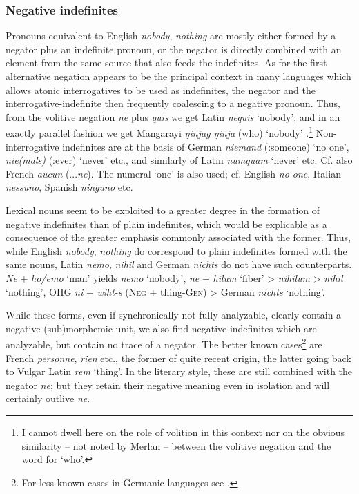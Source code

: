 \subsubsection{Negative indefinites} \label{sec:3.2.2.3}
Pronouns equivalent to English \textit{nobody}, \textit{nothing} are mostly either formed by a negator plus an indefinite pronoun, or the negator is directly combined with an element from the same source that also feeds the indefinites. As for the first alternative negation appears to be the principal context in many languages which allows atonic interrogatives to be used as indefinites, the negator and the interrogative-indefinite then frequently coalescing to a negative pronoun. Thus, from the volitive negation \textit{n\=e} plus \textit{quis} we get Latin \textit{n\=equis} ‘nobody’; and in an exactly parallel fashion we get Mangarayi \textit{ŋiñjag ŋiñja} (\volneg who) ‘nobody’ \citep[36, 119]{Merlan1982}.\footnote{I cannot dwell here on the role of volition in this context nor on the obvious similarity -- not noted by Merlan -- between the volitive negation and the word for ‘who’.} Non-interrogative indefinites are at the basis of German \textit{niemand} (\glneg:someone) ‘no one’, \textit{nie(mals)} (\glneg:ever) ‘never’ etc., and similarly of Latin \textit{numquam} ‘never’ etc. Cf. also French \textit{aucun} (...\textit{ne}). The numeral ‘one’ is also used; cf. English \textit{no one}, Italian \textit{nessuno}, Spanish \textit{ninguno} etc.

Lexical nouns seem to be exploited to a greater degree in the formation of negative indefinites than of plain indefinites, which would be explicable as a consequence of the greater emphasis commonly associated with the former. Thus, while English \textit{nobody}, \textit{nothing} do correspond to plain indefinites formed with the same nouns, Latin \textit{nemo}, \textit{nihil} and German \textit{nichts} do not have such counterparts. \textit{Ne} + \textit{ho/emo} ‘man’ yields \textit{nemo} ‘nobody’, \textit{ne} + \textit{hilum} ‘fiber’ {\textgreater} \textit{nihilum} {\textgreater} \textit{nihil} ‘nothing’, OHG \textit{ni} + \textit{wiht-s} (\textsc{Neg} + thing-\textsc{Gen}) {\textgreater} German \textit{nichts} ‘nothing’.

While these forms, even if synchronically not fully analyzable, clearly contain a negative (sub)morphemic unit, we also find negative indefinites which are analyzable, but contain no trace of a negator. The better known cases\footnote{For less known cases in Germanic languages see \citealt[73]{Krahe1967}.} are French \textit{personne}, \textit{rien} etc., the former of quite recent origin, the latter going back to Vulgar Latin \textit{rem} ‘thing’. In the literary style, these are still combined with the negator \textit{ne}; but they retain their negative meaning even in isolation and will certainly outlive \textit{ne}.

